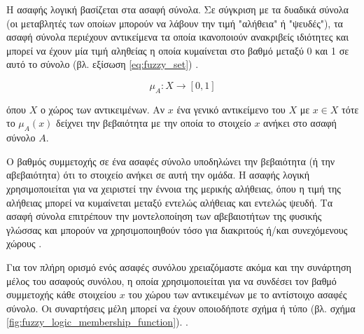 \documentclass{assignment}
\begin{document}
Η ασαφής λογική βασίζεται στα ασαφή σύνολα. Σε σύγκριση με τα δυαδικά σύνολα (οι μεταβλητές των οποίων μπορούν να λάβουν την τιμή "αλήθεια" ή "ψευδές"), τα ασαφή σύνολα περιέχουν αντικείμενα τα οποία ικανοποιούν ανακριβείς ιδιότητες και μπορεί να έχουν μία τιμή αληθείας η οποία κυμαίνεται στο βαθμό μεταξύ 0 και 1 σε αυτό το σύνολο (βλ. εξίσωση \eqref{eq:fuzzy_set}) \cite{zadeh1965338}. 

\begin{equation}
\mu_A : X \rightarrow [0,1]
\label{eq:fuzzy_set}
\end{equation}

όπου $X$ ο χώρος των αντικειμένων. Αν $x$ ένα γενικό αντικείμενο του $X$ με $x \in X$ τότε το $\mu_A(x)$ δείχνει την βεβαιότητα με την οποία το στοιχείο $x$ ανήκει στο ασαφή σύνολο $A$.

Ο βαθμός συμμετοχής σε ένα ασαφές σύνολο υποδηλώνει την βεβαιότητα (ή την αβεβαιότητα) ότι το στοιχείο ανήκει σε αυτή την ομάδα. Η ασαφής λογική χρησιμοποιείται για να χειριστεί την έννοια της μερικής αλήθειας, όπου η τιμή της αλήθειας μπορεί να κυμαίνεται μεταξύ εντελώς αλήθειας και εντελώς ψευδή. Τα ασαφή σύνολα επιτρέπουν την μοντελοποίηση των αβεβαιοτήτων της φυσικής γλώσσας και μπορούν να χρησιμοποιηθούν τόσο για διακριτούς ή/και συνεχόμενους χώρους \cite{engelbrecht,class_notes,wiki:fuzzy_logic}. 

Για τον πλήρη ορισμό ενός ασαφές συνόλου χρειαζόμαστε ακόμα και την συνάρτηση μέλος του ασαφούς συνόλου, η οποία χρησιμοποιείται για να συνδέσει τον βαθμό συμμετοχής κάθε στοιχείου $x$ του χώρου των αντικειμένων με το αντίστοιχο ασαφές σύνολο. Οι συναρτήσεις μέλη μπορεί να έχουν οποιοδήποτε σχήμα ή τύπο (βλ. σχήμα \ref{fig:fuzzy_logic_membership_function}). \cite{engelbrecht}.
\end{document}
